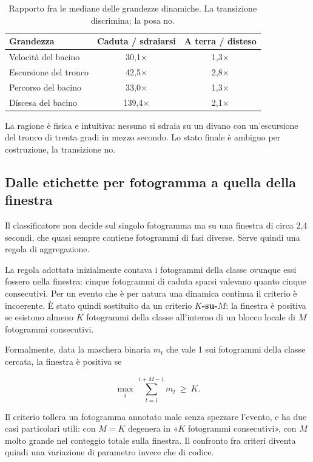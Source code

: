 \begin{table}[ht]
\centering
\caption{Rapporto fra le mediane delle grandezze dinamiche. La transizione
discrimina; la posa no.}
\label{tab:dinamica}
\begin{tabular}{lcc}
\hline
\textbf{Grandezza} & \textbf{Caduta / sdraiarsi} & \textbf{A terra / disteso} \\
\hline
Velocità del bacino & 30,1$\times$ & 1,3$\times$ \\
Escursione del tronco & 42,5$\times$ & 2,8$\times$ \\
Percorso del bacino & 33,0$\times$ & 1,3$\times$ \\
Discesa del bacino & 139,4$\times$ & 2,1$\times$ \\
\hline
\end{tabular}
\end{table}

La ragione è fisica e intuitiva: nessuno si sdraia su un divano con
un'escursione del tronco di trenta gradi in mezzo secondo. Lo stato finale è
ambiguo per costruzione, la transizione no.

\subsection{Dalle etichette per fotogramma a quella della finestra}

Il classificatore non decide sul singolo fotogramma ma su una finestra di circa
2,4 secondi, che quasi sempre contiene fotogrammi di fasi diverse. Serve quindi
una regola di aggregazione.

La regola adottata inizialmente contava i fotogrammi della classe ovunque
essi fossero nella finestra: cinque fotogrammi di caduta sparsi valevano quanto
cinque consecutivi. Per un evento che è per natura una dinamica continua il
criterio è incoerente. È stato quindi sostituito da un criterio
\textbf{$K$-su-$M$}: la finestra è positiva se esistono almeno $K$ fotogrammi
della classe all'interno di un blocco locale di $M$ fotogrammi consecutivi.

Formalmente, data la maschera binaria $m_t$ che vale 1 sui fotogrammi della
classe cercata, la finestra è positiva se

\[
\max_{i}\ \sum_{t=i}^{i+M-1} m_t \ \geq\ K .
\]

Il criterio tollera un fotogramma annotato male senza spezzare l'evento, e ha
due casi particolari utili: con $M = K$ degenera in «$K$ fotogrammi
consecutivi», con $M$ molto grande nel conteggio totale sulla finestra. Il
confronto fra criteri diventa quindi una variazione di parametro invece che di
codice.

